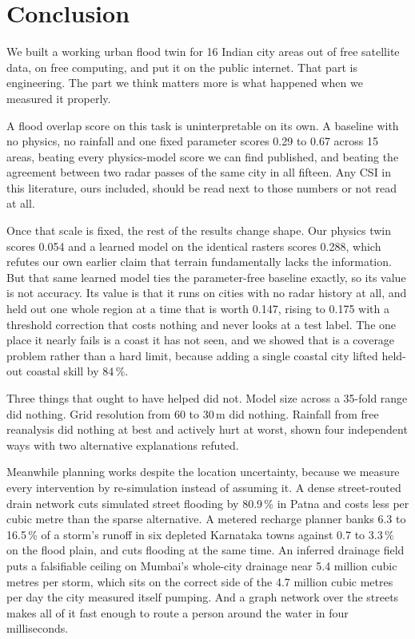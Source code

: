 \section{Conclusion}

We built a working urban flood twin for 16 Indian city areas out of free satellite data, on free
computing, and put it on the public internet. That part is engineering. The part we think matters
more is what happened when we measured it properly.

A flood overlap score on this task is uninterpretable on its own. A baseline with no physics, no
rainfall and one fixed parameter scores 0.29 to 0.67 across 15 areas, beating every physics-model
score we can find published, and beating the agreement between two radar passes of the same city in
all fifteen. Any CSI in this literature, ours included, should be read next to those numbers or not
read at all.

Once that scale is fixed, the rest of the results change shape. Our physics twin scores 0.054 and a
learned model on the identical rasters scores 0.288, which refutes our own earlier claim that
terrain fundamentally lacks the information. But that same learned model ties the parameter-free
baseline exactly, so its value is not accuracy. Its value is that it runs on cities with no radar
history at all, and held out one whole region at a time that is worth 0.147, rising to 0.175 with a
threshold correction that costs nothing and never looks at a test label. The one place it nearly
fails is a coast it has not seen, and we showed that is a coverage problem rather than a hard
limit, because adding a single coastal city lifted held-out coastal skill by 84\,\%.

Three things that ought to have helped did not. Model size across a 35-fold range did nothing.
Grid resolution from 60 to 30\,m did nothing. Rainfall from free reanalysis did nothing at best and
actively hurt at worst, shown four independent ways with two alternative explanations refuted.

Meanwhile planning works despite the location uncertainty, because we measure every intervention by
re-simulation instead of assuming it. A dense street-routed drain network cuts simulated street
flooding by 80.9\,\% in Patna and costs less per cubic metre than the sparse alternative. A metered
recharge planner banks 6.3 to 16.5\,\% of a storm's runoff in six depleted Karnataka towns against
0.7 to 3.3\,\% on the flood plain, and cuts flooding at the same time. An inferred drainage field
puts a falsifiable ceiling on Mumbai's whole-city drainage near 5.4 million cubic metres per storm,
which sits on the correct side of the 4.7 million cubic metres per day the city measured itself
pumping. And a graph network over the streets makes all of it fast enough to route a person around
the water in four milliseconds.

